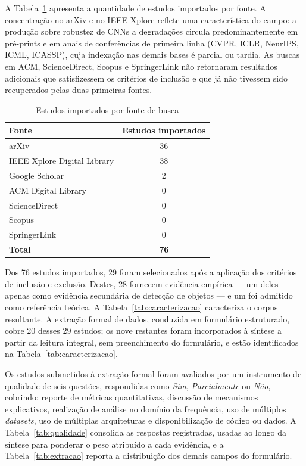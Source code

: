 \documentclass[conference]{IEEEtran}
\begin{document}
A Tabela~\ref{tab:fontes} apresenta a quantidade de estudos importados por
fonte. A concentração no arXiv e no IEEE Xplore reflete uma característica do
campo: a produção sobre robustez de CNNs a degradações circula
predominantemente em pré-prints e em anais de conferências de primeira linha
(CVPR, ICLR, NeurIPS, ICML, ICASSP), cuja indexação nas demais bases é parcial
ou tardia. As buscas em ACM, ScienceDirect, Scopus e SpringerLink não
retornaram resultados adicionais que satisfizessem os critérios de inclusão e
que já não tivessem sido recuperados pelas duas primeiras fontes.

\begin{table}[htbp]
\caption{Estudos importados por fonte de busca}
\begin{center}
\begin{tabular}{|l|c|}
\hline
\textbf{Fonte} & \textbf{Estudos importados} \\
\hline
arXiv & 36 \\
IEEE Xplore Digital Library & 38 \\
Google Scholar & 2 \\
ACM Digital Library & 0 \\
ScienceDirect & 0 \\
Scopus & 0 \\
SpringerLink & 0 \\
\hline
\textbf{Total} & \textbf{76} \\
\hline
\end{tabular}
\label{tab:fontes}
\end{center}
\end{table}

Dos 76 estudos importados, 29 foram selecionados após a aplicação dos critérios
de inclusão e exclusão. Destes, 28 fornecem evidência empírica --- um deles
\cite{b13} apenas como evidência secundária de detecção de objetos --- e um
\cite{b3} foi admitido como referência teórica. A
Tabela~\ref{tab:caracterizacao} caracteriza o corpus resultante. A extração
formal de dados, conduzida em formulário estruturado, cobre 20 desses 29
estudos; os nove restantes foram incorporados à síntese a partir da leitura
integral, sem preenchimento do formulário, e estão identificados na
Tabela~\ref{tab:caracterizacao}.

Os estudos submetidos à extração formal foram avaliados por um instrumento de
qualidade de seis questões, respondidas como \textit{Sim},
\textit{Parcialmente} ou \textit{Não}, cobrindo: reporte de métricas
quantitativas, discussão de mecanismos explicativos, realização de análise
no domínio da frequência, uso de múltiplos \textit{datasets}, uso de múltiplas
arquiteturas e disponibilização de código ou dados. A Tabela~\ref{tab:qualidade}
consolida as respostas registradas, usadas ao longo da síntese para ponderar o peso
atribuído a cada evidência, e a Tabela~\ref{tab:extracao} reporta a
distribuição dos demais campos do formulário.
\end{document}
